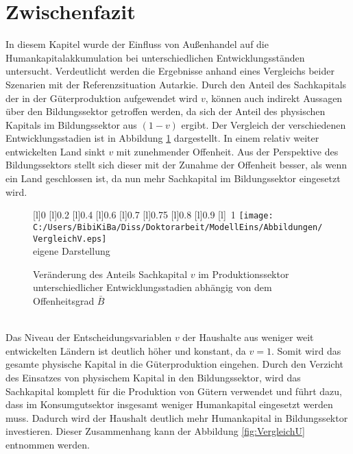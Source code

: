 \section{Zwischenfazit}
In diesem Kapitel wurde der Einfluss von Au{\ss}enhandel auf die Humankapitalakkumulation bei unterschiedlichen Entwicklungsständen untersucht. Verdeutlicht werden die Ergebnisse anhand eines Vergleichs beider Szenarien mit der Referenzsituation Autarkie. Durch den Anteil des Sachkapitals der in der Güterproduktion aufgewendet wird $v$, können auch indirekt Aussagen über den Bildungssektor getroffen werden, da sich der Anteil des physischen Kapitals im Bildungssektor aus $(1-v)$ ergibt. Der Vergleich der verschiedenen Entwicklungsstadien ist in Abbildung \ref{fig:VergleichV} dargestellt. In einem relativ \textcolor[rgb]{0,0.58,0}{weiter entwickelten Land} sinkt $v$ mit zunehmender Offenheit. Aus der Perspektive des Bildungssektors stellt sich dieser mit der Zunahme der Offenheit besser, als wenn ein Land geschlossen ist, da nun mehr Sachkapital im Bildungssektor eingesetzt wird.\\  %
\begin{figure}[htb] 
\vspace{0.13cm}
 \centering 
		[l]{\footnotesize{0}}
		[l]{\footnotesize{0.2}}
		[l]{\footnotesize{0.4}}
		[l]{\footnotesize{0.6}}
		[l]{\footnotesize{0.7}}
		[l]{\footnotesize{0.75}}
		[l]{\footnotesize{0.8}}
		[l]{\footnotesize{0.9}}
		[l]{~\footnotesize{1}}
\texttt{[image: C:/Users/BibiKiBa/Diss/Doktorarbeit/ModellEins/Abbildungen/VergleichV.eps]}
\\
\hfill\footnotesize{}  eigene Darstellung
	\caption{Veränderung des Anteils Sachkapital $v$ im Produktionssektor unterschiedlicher Entwicklungsstadien abhängig von dem Offenheitsgrad $\bar{B}$}
	\label{fig:VergleichV}
\end{figure}
\\
Das Niveau der Entscheidungsvariablen $v$ der Haushalte aus \textcolor[rgb]{0.74,0.97,0.22}{weniger weit entwickelten Ländern} ist deutlich höher und konstant, da $v=1$. Somit wird das gesamte physische Kapital in die Güterproduktion eingehen. Durch den Verzicht des Einsatzes von physischem Kapital in den Bildungssektor, wird das Sachkapital komplett für die Produktion von Gütern verwendet und führt dazu, dass im Konsumgutsektor insgesamt weniger Humankapital eingesetzt werden muss. Dadurch wird der Haushalt deutlich mehr Humankapital in Bildungssektor investieren. Dieser Zusammenhang kann der Abbildung \ref{fig:VergleichU} entnommen werden. %
